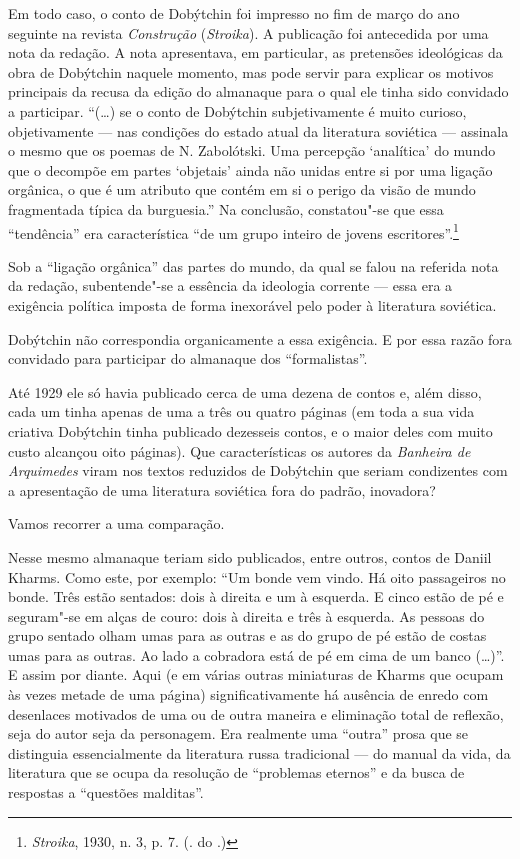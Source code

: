 Em todo caso, o conto de Dobýtchin foi impresso no fim de março do ano
seguinte na revista \emph{Construção} (\emph{Stroika}). A publicação foi
antecedida por uma nota da redação. A nota apresentava, em particular,
as pretensões ideológicas da obra de Dobýtchin naquele momento, mas pode
servir para explicar os motivos principais da recusa da edição do
almanaque para o qual ele tinha sido convidado a participar. ``(\ldots{}) se
o conto de Dobýtchin subjetivamente é muito curioso, objetivamente ---
nas condições do estado atual da literatura soviética --- assinala o
mesmo que os poemas de N. Zabolótski. Uma percepção `analítica' do
mundo que o decompõe em partes `objetais' ainda não unidas entre si
por uma ligação orgânica, o que é um atributo que contém em si o
perigo da visão de mundo fragmentada típica da burguesia.'' Na
conclusão, constatou"-se que essa ``tendência'' era característica ``de
um grupo inteiro de jovens escritores''.\footnote{\emph{Stroika}, 1930,
  n. 3, p. 7. (\scalebox{.8}{N}. do \scalebox{.8}{A}.)}

Sob a ``ligação orgânica'' das partes do mundo, da qual se falou na
referida nota da redação, subentende"-se a essência da ideologia corrente
--- essa era a exigência política imposta de forma inexorável pelo poder
à literatura soviética.

Dobýtchin não correspondia organicamente a essa exigência. E por essa
razão fora convidado para participar do almanaque dos ``formalistas''.

Até 1929 ele só havia publicado cerca de uma dezena de contos e, além
disso, cada um tinha apenas de uma a três ou quatro páginas (em toda a
sua vida criativa Dobýtchin tinha publicado dezesseis contos, e o maior deles
com muito custo alcançou oito páginas). Que características os autores
da \emph{Banheira de Arquimedes} viram nos textos reduzidos de Dobýtchin
que seriam condizentes com a apresentação de uma literatura soviética
fora do padrão, inovadora?

Vamos recorrer a uma comparação.

Nesse mesmo almanaque teriam sido publicados, entre outros, contos de
Daniil Kharms. Como este, por exemplo: ``Um bonde vem vindo. Há oito
passageiros no bonde. Três estão sentados: dois à direita e um à
esquerda. E cinco estão de pé e seguram"-se em alças de couro: dois à
direita e três à esquerda. As pessoas do grupo sentado olham umas para
as outras e as do grupo de pé estão de costas umas para as outras. Ao
lado a cobradora está de pé em cima de um banco (\ldots{})''. E assim por
diante. Aqui (e em várias outras miniaturas de Kharms que ocupam às
vezes metade de uma página) significativamente há ausência de enredo com
desenlaces motivados de uma ou de outra maneira e eliminação total de
reflexão, seja do autor seja da personagem. Era realmente uma ``outra''
prosa que se distinguia essencialmente da literatura russa tradicional
--- do manual da vida, da literatura que se ocupa da resolução de
``problemas eternos'' e da busca de respostas a ``questões malditas''.

